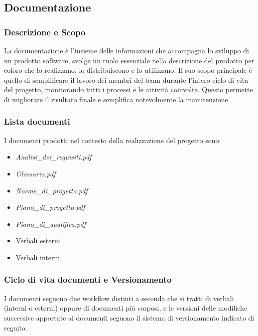 \subsection{Documentazione}

\subsubsection{Descrizione e Scopo}
La documentazione è l'insieme delle informazioni che accompagna lo sviluppo di un prodotto software, svolge un ruolo essenziale nella descrizione del prodotto per coloro che lo realizzano, lo distribuiscono e lo utilizzano.
Il suo scopo principale è quello di semplificare il lavoro dei membri del team durante l'intero ciclo di vita del progetto, monitorando tutti i processi e le attività coinvolte. Questo permette di migliorare il risultato finale e semplifica notevolmente la manutenzione.\\

\subsubsection{Lista documenti}
I documenti prodotti nel contesto della realizzazione del progetto sono:
\begin{itemize}
    \item \textit{Analisi\_dei\_requisiti.pdf}
    \item \textit{Glossario.pdf}
    \item \textit{Norme\_di\_progetto.pdf}
    \item \textit{Piano\_di\_progetto.pdf}
    \item \textit{Piano\_di\_qualifica.pdf}
    \item Verbali esterni
    \item Verbali interni
\end{itemize}

\subsubsection{Ciclo di vita documenti e Versionamento}
I documenti seguono due workflow distinti a seconda che si tratti di verbali (interni o esterni) oppure di documenti più corposi, e le versioni delle modifiche successive apportate ai documenti seguono il sistema di versionamento indicato di seguito.\\

